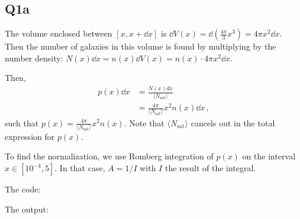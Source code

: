 \subsection{Q1a}

The volume enclosed between $[x, x+\dd x]$ is $\dd V(x) = \dd (\frac{4\pi}{3}x^3) = 4 \pi x^2 \dd x$. 
Then the number of galaxies in this volume is found by multiplying by the number density: $N(x)\dd x = n(x)\dd V(x) = n(x) \cdot 4 \pi x^2 \dd x$.

Then,
\begin{align}
    p(x) \dd x 
    &= \frac{N(x)dx}{\langle N_{\mathrm{sat}}\rangle} \\
    &= \frac{4\pi}{\langle N_{\mathrm{sat}}\rangle} x^2 n(x) \dd x \, ,
\end{align}
such that $p(x) = \frac{4\pi}{\langle N_{\mathrm{sat}}\rangle} x^2 n(x)$. Note that $\langle N_{\mathrm{sat}}\rangle$ cancels
out in the total expression for $p(x)$.

To find the normalization, we use Romberg integration of $p(x)$ on the interval $x \in [10^{-4}, 5]$. 
In that case, $A = 1/I$ with $I$ the result of the integral.

\noindent The code:



\noindent The output:


